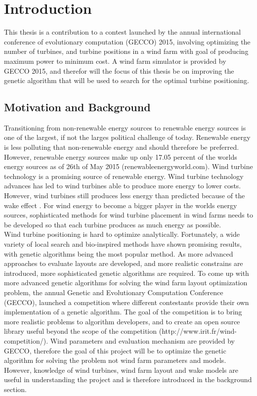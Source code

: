 \chapter{Introduction}
This thesis is a contribution to a contest launched by the annual international conference of evolutionary computation (GECCO) 2015, involving optimizing the number of turbines, and turbine positions in a wind farm with goal of producing maximum power to minimum cost. A wind farm simulator is provided by GECCO 2015, and therefor will the focus of this thesis be on improving the genetic algorithm that will be used to search for the optimal turbine positioning.


\section{Motivation and Background}
Transitioning from non-renewable energy sources to renewable energy sources is one of the largest, if not the larges political challenge of today. Renewable energy is less polluting that non-renewable energy and should therefore be preferred. However, renewable energy sources make up only 17.05 percent of the worlds energy sources as of 26th of May 2015 (renewableenergyworld.com). Wind turbine technology is a promising source of renewable energy. Wind turbine technology advances has led to wind turbines able to produce more energy to lower costs. However, wind turbines still produces less energy than predicted because of the wake effect \citep{Samorani}. For wind energy to become a bigger player in the worlds energy sources, sophisticated methods for wind turbine placement in wind farms needs to be developed so that each turbine produces as much energy as possible. \\

\noindent Wind turbine positioning is hard to optimize analytically. Fortunately, a wide variety of local search and bio-inspired methods have shown promising results, with genetic algorithms being the most popular method. As more advanced approaches to evaluate layouts are developed, and more realistic constrains are introduced, more sophisticated genetic algorithms are required. To come up with more advanced genetic algorithms for solving the wind farm layout optimization problem, the annual Genetic and Evolutionary Computation Conference (GECCO), launched a competition where different contestants provide their own implementation of a genetic algorithm. The goal of the competition is to bring more realistic problems to algorithm developers, and to create an open source library useful beyond the scope of the competition (http://www.irit.fr/wind-competition/). Wind parameters and evaluation mechanism are provided by GECCO, therefore the goal of this project will be to optimize the genetic algorithm for solving the problem not wind farm parameters and models. However, knowledge of wind turbines, wind farm layout and wake models are useful in understanding the project and is therefore introduced in the background section. \\


